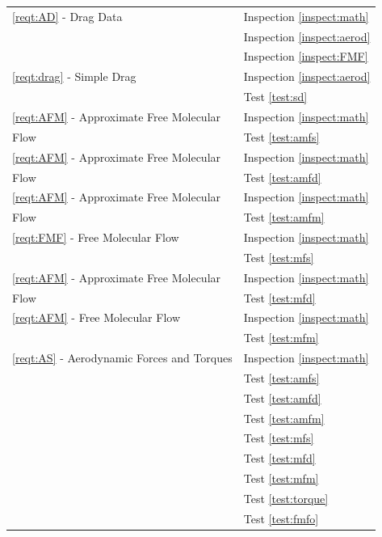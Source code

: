 \begin{longtable}[c]{||p{3in}|p{3in}|}
\ref{reqt:AD} - Drag Data &
     Inspection \ref{inspect:math} \\
   & Inspection \ref{inspect:aerod} \\
   & Inspection \ref{inspect:FMF} \\
   \hline
\ref{reqt:drag} - Simple Drag &
     Inspection \ref{inspect:aerod} \\
   & Test \ref{test:sd} \\
   \hline
\ref{reqt:AFM} - Approximate Free Molecular &
     Inspection \ref{inspect:math} \\
                 Flow &
     Test \ref{test:amfs} \\
   \hline
\ref{reqt:AFM} - Approximate Free Molecular &
     Inspection \ref{inspect:math} \\
                 Flow &
     Test \ref{test:amfd} \\
   \hline
\ref{reqt:AFM} - Approximate Free Molecular &
     Inspection \ref{inspect:math} \\
                 Flow &
     Test \ref{test:amfm} \\
   \hline
\ref{reqt:FMF} - Free Molecular Flow &
     Inspection \ref{inspect:math} \\
   & Test \ref{test:mfs} \\
   \hline
\ref{reqt:AFM} - Approximate Free Molecular &
     Inspection \ref{inspect:math} \\
                 Flow &
     Test \ref{test:mfd} \\
   \hline
\ref{reqt:AFM} - Free Molecular Flow &
     Inspection \ref{inspect:math} \\
   & Test \ref{test:mfm} \\
   \hline
\ref{reqt:AS} - Aerodynamic Forces and Torques &
     Inspection \ref{inspect:math} \\
   & Test \ref{test:amfs}\\
   & Test \ref{test:amfd}\\
   & Test \ref{test:amfm}\\
   & Test \ref{test:mfs} \\
   & Test \ref{test:mfd}\\
   & Test \ref{test:mfm}\\
   & Test \ref{test:torque}\\
   & Test \ref{test:fmfo}
\end{longtable}
